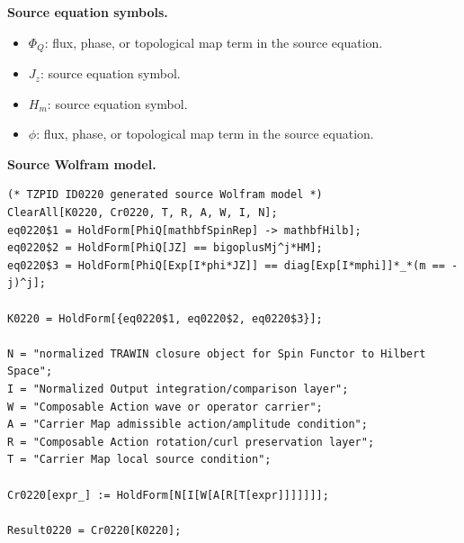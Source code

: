 \begin{minipage}[t]{0.49\linewidth}
\begingroup
\small
\raggedright
\textbf{Source equation symbols.}\par
\begin{itemize}[leftmargin=1.35em,itemsep=1pt,topsep=1pt,parsep=0pt]
    \item $\Phi_Q$: flux, phase, or topological map term in the source equation.
    \item $J_z$: source equation symbol.
    \item $H_m$: source equation symbol.
    \item $\phi$: flux, phase, or topological map term in the source equation.
\end{itemize}
\endgroup
\end{minipage}\hfill
\begin{minipage}[t]{0.47\linewidth}
\begingroup
\scriptsize
\raggedright
\textbf{Source Wolfram model.}\par
\begin{Verbatim}[fontsize=\tiny,breaklines=true,breakanywhere=true]
(* TZPID ID0220 generated source Wolfram model *)
ClearAll[K0220, Cr0220, T, R, A, W, I, N];
eq0220$1 = HoldForm[PhiQ[mathbfSpinRep] -> mathbfHilb];
eq0220$2 = HoldForm[PhiQ[JZ] == bigoplusMj^j*HM];
eq0220$3 = HoldForm[PhiQ[Exp[I*phi*JZ]] == diag[Exp[I*mphi]]*_*(m == -j)^j];

K0220 = HoldForm[{eq0220$1, eq0220$2, eq0220$3}];

N = "normalized TRAWIN closure object for Spin Functor to Hilbert Space";
I = "Normalized Output integration/comparison layer";
W = "Composable Action wave or operator carrier";
A = "Carrier Map admissible action/amplitude condition";
R = "Composable Action rotation/curl preservation layer";
T = "Carrier Map local source condition";

Cr0220[expr_] := HoldForm[N[I[W[A[R[T[expr]]]]]]];

Result0220 = Cr0220[K0220];
\end{Verbatim}
\endgroup
\end{minipage}

